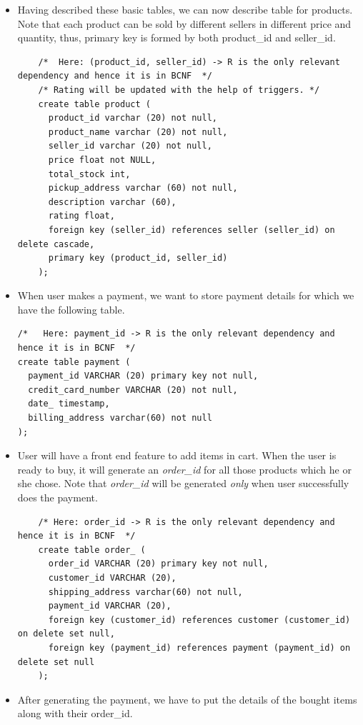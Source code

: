 \documentclass[a4paper,12pt]{article}
\newcommand{\ita}[1]{
    \textit{#1}
}
\begin{document}
\begin{itemize}
\begin{verbatim}
  \end{verbatim}
  \item Having described these basic tables, we can now describe table for products. Note that each product can be sold by different sellers in different price and quantity, thus, primary key is formed by both product\_id and seller\_id. 
  \begin{verbatim}
    /*  Here: (product_id, seller_id) -> R is the only relevant dependency and hence it is in BCNF  */
    /* Rating will be updated with the help of triggers. */
    create table product (
      product_id varchar (20) not null,
      product_name varchar (20) not null,
      seller_id varchar (20) not null,
      price float not NULL,
      total_stock int,
      pickup_address varchar (60) not null,
      description varchar (60),
      rating float,
      foreign key (seller_id) references seller (seller_id) on delete cascade,
      primary key (product_id, seller_id)
    );
  \end{verbatim}
  \item When user makes a payment, we want to store payment details for which we have the following table.
  \begin{verbatim}
/*   Here: payment_id -> R is the only relevant dependency and hence it is in BCNF  */
create table payment (
  payment_id VARCHAR (20) primary key not null,
  credit_card_number VARCHAR (20) not null,
  date_ timestamp,
  billing_address varchar(60) not null
);
  \end{verbatim}
  \item User will have a front end feature to add items in cart. When the user is ready to buy, it will generate an \ita{order\_id} for all those products which he or she chose. Note that \ita{order\_id} will be generated \ita{only} when user successfully does the payment.
  \begin{verbatim}
    /* Here: order_id -> R is the only relevant dependency and hence it is in BCNF  */
    create table order_ (
      order_id VARCHAR (20) primary key not null,
      customer_id VARCHAR (20),
      shipping_address varchar(60) not null,
      payment_id VARCHAR (20),
      foreign key (customer_id) references customer (customer_id) on delete set null,
      foreign key (payment_id) references payment (payment_id) on delete set null
    );
  \end{verbatim}
  \item After generating the payment, we have to put the details of the bought items along with their order\_id.
  \begin{verbatim}

\end{verbatim}
\end{itemize}
\end{document}
